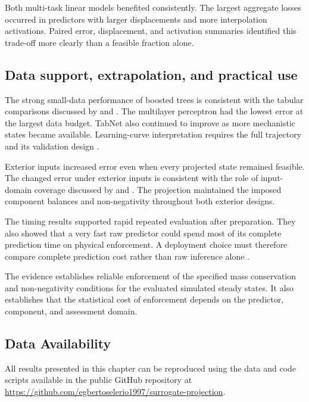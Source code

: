 Both multi-task linear models benefited consistently. The largest aggregate losses occurred in predictors with larger displacements and more interpolation activations. Paired error, displacement, and activation summaries identified this trade-off more clearly than a feasible fraction alone.

\subsection{Data support, extrapolation, and practical use}

The strong small-data performance of boosted trees is consistent with the tabular comparisons discussed by \citet{Borisov2024} and \citet{ShwartzZiv2022}. The multilayer perceptron had the lowest error at the largest data budget. TabNet also continued to improve as more mechanistic states became available. Learning-curve interpretation requires the full trajectory and its validation design \citep{VieringLoog2023}.

Exterior inputs increased error even when every projected state remained feasible. The changed error under exterior inputs is consistent with the role of input-domain coverage discussed by \citet{Shen2023} and \citet{Valente2025}. The projection maintained the imposed component balances and non-negativity throughout both exterior designs.

The timing results supported rapid repeated evaluation after preparation. They also showed that a very fast raw predictor could spend most of its complete prediction time on physical enforcement. A deployment choice must therefore compare complete prediction cost rather than raw inference alone \citep{BhosekarIerapetritou2018,Bliek2023}.

The evidence establishes reliable enforcement of the specified mass conservation and non-negativity conditions for the evaluated simulated steady states. It also establishes that the statistical cost of enforcement depends on the predictor, component, and assessment domain.

\subsection{Data Availability}
\label{sec:projection_data_availability}

All results presented in this chapter can be reproduced using the data and code scripts available in the public GitHub repository at \url{https://github.com/egbertoselerio1997/surrogate-projection}.
